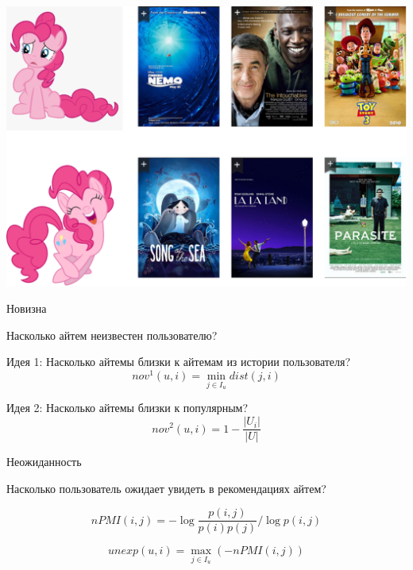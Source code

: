 \documentclass[11pt,aspectratio=169,handout]{beamer}
\begin{document}
\begin{frame}{}
\begin{center}
\includegraphics[scale=0.2]{images/serendipity-pony.png}
\end{center}
\end{frame}

\begin{frame}{Новизна}

\begin{tcolorbox}[colback=info!5,colframe=info!80,title=]
[novelty] Насколько айтем неизвестен пользователю?
\end{tcolorbox}

Идея 1: Насколько айтемы близки к айтемам из истории пользователя?
\[
nov^1(u, i) = \min_{j \in I_u} dist(j, i)
\]

Идея 2: Насколько айтемы близки к популярным?
\[
nov^2(u, i) = 1 - \frac{|U_i|}{|U|}
\]

\end{frame}

\begin{frame}{Неожиданность}

\begin{tcolorbox}[colback=info!5,colframe=info!80,title=]
[unexpectedness] Насколько пользователь ожидает увидеть в рекомендациях айтем?
\end{tcolorbox}

\[
nPMI(i, j) = - \log \frac{p(i, j)}{p(i)p(j)} / \log p(i, j)
\]

\[
unexp(u, i) = \max_{j \in I_u} \left( -nPMI(i, j) \right)
\]

\end{frame}
\end{document}

